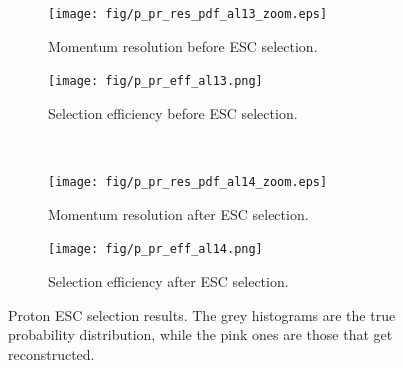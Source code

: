    \begin{figure}[t]
      \centering
      \begin{subfigure}{0.45\textwidth}
           \texttt{[image: fig/p\_pr\_res\_pdf\_al13\_zoom.eps]}
           \caption{Momentum resolution before ESC selection.}
           \label{fig:ppr-res-bfESC}
      \end{subfigure}
      \begin{subfigure}{0.45\textwidth}
           \texttt{[image: fig/p\_pr\_eff\_al13.png]}
           \caption{Selection efficiency before ESC selection.}
           \label{fig:ppr-eff-bfESC}
      \end{subfigure}
      \\
      \begin{subfigure}{0.45\textwidth}
           \texttt{[image: fig/p\_pr\_res\_pdf\_al14\_zoom.eps]}
           \caption{Momentum resolution after ESC selection.}
           \label{fig:ppr-res-afESC}
      \end{subfigure}
      \begin{subfigure}{0.45\textwidth}
           \texttt{[image: fig/p\_pr\_eff\_al14.png]}
           \caption{Selection efficiency after ESC selection.}
           \label{fig:ppr-eff-afESC}
      \end{subfigure}
      \caption{Proton ESC selection results. The grey histograms are the true probability distribution, while the pink ones are those that get reconstructed. }
      \label{fig:pprESC-res}
   \end{figure}

    
